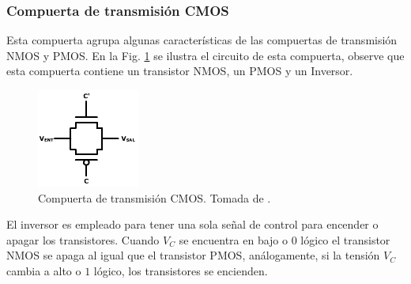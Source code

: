 \documentclass[twocolumn]{IEEEtran}
\begin{document}
\subsubsection{Compuerta de transmisión CMOS}
\noindent
Esta compuerta agrupa algunas características de las compuertas de transmisión NMOS y PMOS. En la Fig. \ref{fig5} se ilustra el circuito de esta compuerta, observe que esta compuerta contiene un transistor NMOS, un PMOS y un Inversor.
\begin{figure}[H]
  \centering
    \includegraphics[scale=0.7]{fig5.png}
      \caption{Compuerta de transmisión CMOS. Tomada de \cite{page1}.}
	\label{fig5}
\end{figure}
\noindent
El inversor es empleado para tener una sola señal de control para encender o apagar los transistores. Cuando $V_C$ se encuentra en bajo o $0$ lógico el transistor NMOS se apaga al igual que el transistor PMOS, análogamente, si la tensión $V_C$ cambia a alto o $1$ lógico, los transistores se encienden.
\end{document}

